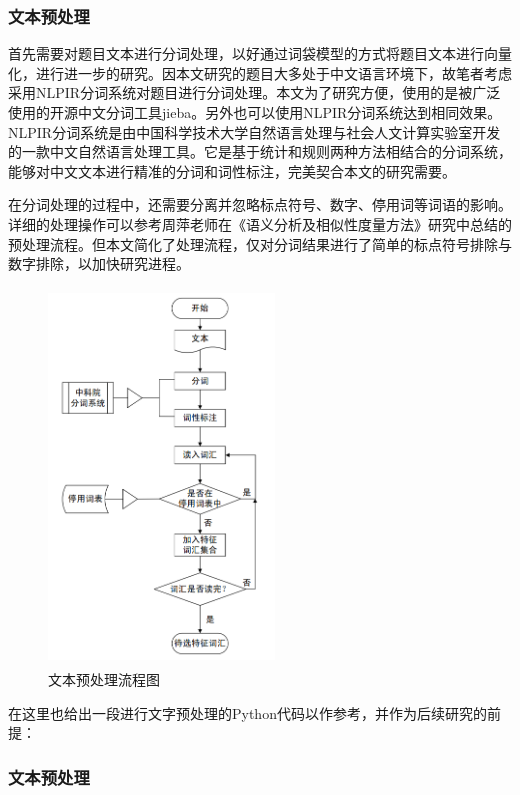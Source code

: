 \subsubsection{文本预处理}

首先需要对题目文本进行分词处理，以好通过词袋模型的方式将题目文本进行向量化，进行进一步的研究。因本文研究的题目大多处于中文语言环境下，故笔者考虑采用NLPIR分词系统对题目进行分词处理。本文为了研究方便，使用的是被广泛使用的开源中文分词工具jieba。另外也可以使用NLPIR分词系统达到相同效果。NLPIR分词系统是由中国科学技术大学自然语言处理与社会人文计算实验室开发的一款中文自然语言处理工具。它是基于统计和规则两种方法相结合的分词系统，能够对中文文本进行精准的分词和词性标注，完美契合本文的研究需要。

在分词处理的过程中，还需要分离并忽略标点符号、数字、停用词等词语的影响。详细的处理操作可以参考周萍老师在《语义分析及相似性度量方法》\cite{}研究中总结的预处理流程。但本文简化了处理流程，仅对分词结果进行了简单的标点符号排除与数字排除，以加快研究进程。

\begin{figure}[htbp]
    \centering
    \includegraphics[width=6cm,height=10cm]{res/Text preprocessing process.png}
    \caption{文本预处理流程图}
\end{figure} 

在这里也给出一段进行文字预处理的Python代码以作参考，并作为后续研究的前提：

\begin{mgCodeBlock}
\end{mgCodeBlock}

\subsubsection{文本预处理}


